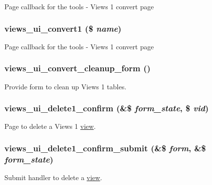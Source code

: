 Page callback for the tools - Views 1 convert page \hypertarget{convert_8inc_b48ce81999b85b4e7dae3c3d37747fb4}{
\subsubsection[{views\_\-ui\_\-convert1}]{\setlength{\rightskip}{0pt plus 5cm}views\_\-ui\_\-convert1 (\$ {\em name})}}
\label{convert_8inc_b48ce81999b85b4e7dae3c3d37747fb4}


Page callback for the tools - Views 1 convert page \hypertarget{convert_8inc_54b9bf835ef91d928ad8aeb9784a7af6}{
\subsubsection[{views\_\-ui\_\-convert\_\-cleanup\_\-form}]{\setlength{\rightskip}{0pt plus 5cm}views\_\-ui\_\-convert\_\-cleanup\_\-form ()}}
\label{convert_8inc_54b9bf835ef91d928ad8aeb9784a7af6}


Provide form to clean up Views 1 tables. \hypertarget{convert_8inc_de6d4a86710f754ba1e05be3b446d95f}{
\subsubsection[{views\_\-ui\_\-delete1\_\-confirm}]{\setlength{\rightskip}{0pt plus 5cm}views\_\-ui\_\-delete1\_\-confirm (\&\$ {\em form\_\-state}, \/  \$ {\em vid})}}
\label{convert_8inc_de6d4a86710f754ba1e05be3b446d95f}


Page to delete a Views 1 \hyperlink{classview}{view}. \hypertarget{convert_8inc_ebaef1b0acd2551dcd4aee8aee9107db}{
\subsubsection[{views\_\-ui\_\-delete1\_\-confirm\_\-submit}]{\setlength{\rightskip}{0pt plus 5cm}views\_\-ui\_\-delete1\_\-confirm\_\-submit (\&\$ {\em form}, \/  \&\$ {\em form\_\-state})}}
\label{convert_8inc_ebaef1b0acd2551dcd4aee8aee9107db}


Submit handler to delete a \hyperlink{classview}{view}. 